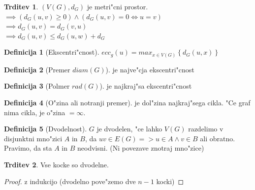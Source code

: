 \documentclass{article}
\theoremstyle{definition}
\newtheorem{definition}{Definicija}[section]
\newtheorem{claim}{Trditev}[section]
\begin{document}
	\begin{claim}
		$(V(G), d_G)$ je metri"cni prostor. \\
			$\implies (d_G(u,v) \geq 0) \land (d_G(u,v) = 0 \iff u = v)$ \\ 
			$\implies d_G(u,v) = d_G(v,u)$ \\ 
			$\implies d_G(u,v) \leq d_G(u,w) + d_G$
	\end{claim}
	
	\begin{definition}[Ekscentri"cnost]
		$ecc_g(u) = max_{x \in V(G)}\left\lbrace d_G(u,x)\right\rbrace$
	\end{definition}
	\begin{definition}[Premer $diam(G)$]
		je najve"cja ekscentri"cnost
	\end{definition}
	\begin{definition}[Polmer $rad(G)$]
		je najkraj"sa ekscentri"cnost
	\end{definition}
	\begin{definition}[O"zina ali notranji premer]
		je dol"zina najkraj"sega cikla. "Ce graf nima cikla, je o"zina $= \infty$.
	\end{definition} 
	
	\begin{definition}[Dvodelnost] 
		$G$ je dvodelen, "ce lahko $V(G)$ razdelimo v disjunktni mno"zici $A$ in $B$, da $uv \in E(G) => u \in A \land v \in B$ ali obratno. \\ 
		Pravimo, da sta $A$ in $B$ neodvisni. (Ni povezave znotraj mno"zice)
	\end{definition}
	
	\begin{claim} 
		Vse kocke so dvodelne.
		\begin{proof}
			z indukcijo (dvodelno pove"zemo dve $n-1$ kocki)
		\end{proof} 
	\end{claim}
	
\end{document}
